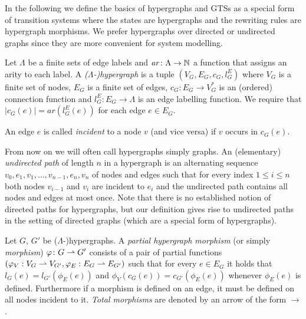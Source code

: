\documentclass{llncs}
\newcommand{\arity}{\mathit{ar}}
\begin{document}
In the following we define the basics of hypergraphs and GTSs as a
special form of transition systems where the states are hypergraphs
and the rewriting rules are hypergraph morphisms. We prefer
hypergraphs over directed or undirected graphs since they are more
convenient for system modelling.

\begin{definition}[Hypergraph]\label{def:hypergraph}
  Let $\Lambda$ be a finite sets of edge labels and $\arity \colon
  \Lambda \to \nat$ a function that assigns an arity to each label.  A
  \emph{($\Lambda$-)hypergraph} is a tuple $(V_{G}, E_{G}, c_{G},
  l_G^E)$ where $V_{G}$ is a finite set of nodes, $E_{G}$ is a finite
  set of edges, $c_{G}\colon E_{G} \rightarrow V_{G}^*$ is an (ordered)
  connection function and $l_G^E\colon E_{G} \rightarrow \Lambda$ is
  an edge labelling function. We require that $|c_G(e)| =
  \arity(l_G^E(e))$ for each edge $e \in E_G$.

  An edge $e$ is called \emph{incident} to a node $v$ (and vice versa) if $v$ 
  occurs in $c_G(e)$.
\end{definition}

From now on we will often call hypergraphs simply graphs.  An (elementary)
\emph{undirected path} of length $n$ in a hypergraph is an alternating
sequence $v_0, e_1, v_1, \dots, v_{n-1}, e_n, v_n$ of nodes and edges
such that for every index $1\le i \le n$ both nodes $v_{i-1}$ and
$v_i$ are incident to $e_i$ and the undirected path contains all nodes
and edges at most once.  Note that there is no established notion of
directed paths for hypergraphs, but our definition gives rise to
undirected paths in the setting of directed graphs (which are a
special form of hypergraphs).


\begin{definition}\label{def:morphism}
Let $G$, $G'$ be ($\Lambda$-)hyper\-graphs. A \emph{partial hypergraph 
morphism} (or simply \emph{morphism}) $\varphi \colon G\rightharpoonup G'$ consists of a 
pair of partial functions $(\varphi_{V}: V_{G} \rightharpoonup V_{G'}, \varphi_{E}: E_{G} \rightharpoonup 
E_{G'})$ such that for every $e \in E_{G}$ it holds that $l_{G}(e) = 
l_{G'}(\phi_E(e))$ and $\phi_{V}(c_{G}(e)) = c_{G'}(\phi_{E}(e))$ whenever 
$\phi_E(e)$ is defined. Furthermore if a morphism is defined on an edge, it 
must be defined on all nodes incident to it.
\emph{Total morphisms} are denoted by an arrow of the form $\to$.
\end{definition}
\end{document}
